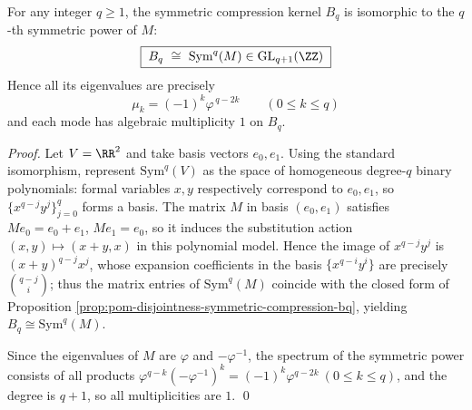 \begin{proposition}[\texorpdfstring{$B_q=\mathrm{Sym}^q(M)$}{Bq=Sym^q(M)} and explicit spectrum]\label{prop:pom-bq-is-symq-and-spectrum}
For any integer \(q\ge 1\), the symmetric compression kernel \(B_q\) is isomorphic to the \(q\)-th symmetric power of \(M\):
\[
\boxed{\;B_q\ \cong\ \mathrm{Sym}^q(M)\in \mathrm{GL}_{q+1}(\ZZ)\;}
\]
Hence all its eigenvalues are precisely
\[
\boxed{\;\mu_k=(-1)^k\varphi^{\,q-2k}\qquad(0\le k\le q)\;}
\]
and each mode has algebraic multiplicity \(1\) on \(B_q\).
\end{proposition}
\begin{proof}
Let \(V=\RR^2\) and take basis vectors \(e_0,e_1\).
Using the standard isomorphism, represent \(\mathrm{Sym}^q(V)\) as the space of homogeneous degree-\(q\) binary polynomials: formal variables \(x,y\) respectively correspond to \(e_0,e_1\), so \(\{x^{q-j}y^j\}_{j=0}^{q}\) forms a basis.
The matrix \(M\) in basis \((e_0,e_1)\) satisfies \(Me_0=e_0+e_1\), \(Me_1=e_0\), so it induces the substitution action
\((x,y)\mapsto (x+y,x)\) in this polynomial model.
Hence the image of \(x^{q-j}y^j\) is \((x+y)^{q-j}x^{j}\), whose expansion coefficients in the basis \(\{x^{q-i}y^i\}\) are precisely \(\binom{q-j}{i}\);
thus the matrix entries of \(\mathrm{Sym}^q(M)\) coincide with the closed form of Proposition \ref{prop:pom-disjointness-symmetric-compression-bq}, yielding \(B_q\cong\mathrm{Sym}^q(M)\).
\par
Since the eigenvalues of \(M\) are \(\varphi\) and \(-\varphi^{-1}\), the spectrum of the symmetric power consists of all products \(\varphi^{q-k}(-\varphi^{-1})^{k}=(-1)^k\varphi^{q-2k}\ (0\le k\le q)\), and the degree is \(q+1\), so all multiplicities are \(1\). \qed
\end{proof}

